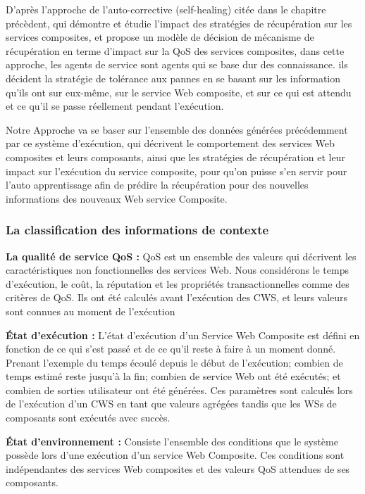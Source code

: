 D'après l'approche de l'auto-corrective (self-healing) citée dans le chapitre précèdent, qui démontre et étudie l'impact des stratégies de récupération sur les services composites, et propose un modèle de décision de mécanisme de récupération en terme d'impact sur la QoS des services composites, dans cette approche, les agents de service sont agents qui se base dur des connaissance. ils décident la stratégie de tolérance aux pannes en se basant sur les information qu'ils ont sur eux-même, sur le service Web composite, et sur ce qui est attendu et ce qu'il se passe réellement pendant l'exécution.\cite{1}

Notre Approche va se baser sur l'ensemble des données générées précédemment par ce système d'exécution, qui décrivent le comportement des services Web composites et leurs composants, ainsi que les stratégies de récupération et leur impact sur l'exécution du service composite, pour qu'on puisse s'en servir pour l'auto apprentissage afin de prédire la récupération pour des nouvelles informations des nouveaux Web service Composite.

\subsubsection{La classification des informations de contexte}


\textbf{La qualité de service QoS :}  QoS est un ensemble des valeurs qui décrivent les caractéristiques non fonctionnelles des services Web. Nous considérons le temps d'exécution, le coût, la réputation et les propriétés transactionnelles comme des critères de QoS. Ils ont été calculés avant l'exécution des CWS, et leurs valeurs sont connues au moment de l'exécution \cite{2}

\textbf{État d'exécution :}  L'état d'exécution d'un Service Web Composite est défini en fonction de ce qui s'est passé et de ce qu'il reste à faire à un moment donné.
Prenant l'exemple du temps écoulé depuis le début de l'exécution; combien de temps estimé reste jusqu'à la fin; combien de service Web ont été exécutés; et combien de sorties utilisateur ont été générées. Ces paramètres sont calculés lors de l'exécution d'un CWS en tant que valeurs agrégées tandis que les WSs de composants sont exécutés avec succès.

\textbf{État d'environnement :} Consiste l'ensemble des conditions que le système possède lors d'une exécution d'un service Web Composite. Ces conditions sont indépendantes des services Web composites et des valeurs QoS attendues de ses composants.



